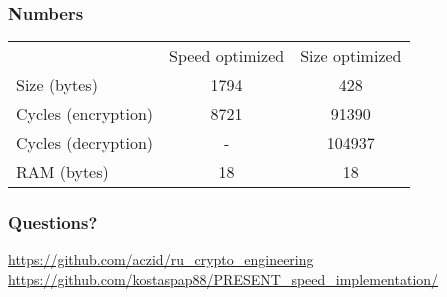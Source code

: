 \documentclass{beamer}
\begin{document}
\begin{frame}[fragile]
\frametitle{Numbers}
	\begin{tabular}{ l c c }

                & Speed optimized & Size optimized \\
        Size (bytes) & 1794 & 428 \\
        Cycles (encryption) & 8721 & 91390 \\
        Cycles (decryption) & - & 104937 \\
        RAM (bytes) & 18 & 18

	\end{tabular}
\end{frame}

\begin{frame}[fragile]
\frametitle{Questions?}
	\footnotesize{
	\url{https://github.com/aczid/ru_crypto_engineering}
	\url{https://github.com/kostaspap88/PRESENT_speed_implementation/}
	}
\end{frame}
\end{document}
